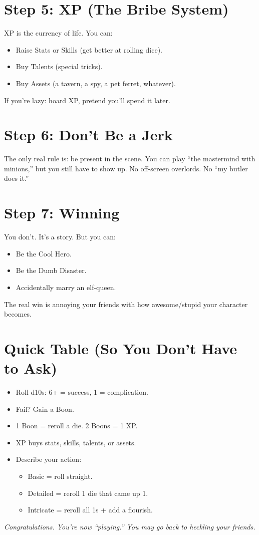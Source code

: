 \documentclass[11pt]{article}
\begin{document}
\section*{Step 5: XP (The Bribe System)}
XP is the currency of life. You can:  
\begin{itemize}[noitemsep]
    \item Raise Stats or Skills (get better at rolling dice).  
    \item Buy Talents (special tricks).  
    \item Buy Assets (a tavern, a spy, a pet ferret, whatever).  
\end{itemize}
If you’re lazy: hoard XP, pretend you’ll spend it later.  

\section*{Step 6: Don’t Be a Jerk}
The only real rule is: be present in the scene. You can play “the mastermind with minions,” but you still have to show up. No off-screen overlords. No “my butler does it.”  

\section*{Step 7: Winning}
You don’t. It’s a story. But you can:  
\begin{itemize}[noitemsep]
    \item Be the Cool Hero.  
    \item Be the Dumb Disaster.  
    \item Accidentally marry an elf-queen.  
\end{itemize}
The real win is annoying your friends with how awesome/stupid your character becomes.  

\section*{Quick Table (So You Don’t Have to Ask)}
\begin{tcolorbox}[colback=gray!10, colframe=black, title=Cheat Sheet]
\begin{itemize}[noitemsep]
    \item Roll d10s: 6+ = success, 1 = complication.  
    \item Fail? Gain a Boon.  
    \item 1 Boon = reroll a die. 2 Boons = 1 XP.  
    \item XP buys stats, skills, talents, or assets.  
    \item Describe your action:  
    \begin{itemize}[noitemsep]
        \item Basic = roll straight.  
        \item Detailed = reroll 1 die that came up 1.  
        \item Intricate = reroll all 1s + add a flourish.  
    \end{itemize}
\end{itemize}
\end{tcolorbox}

\bigskip
\begin{center}
\textit{Congratulations. You’re now “playing.” You may go back to heckling your friends.}
\end{center}
\end{document}

